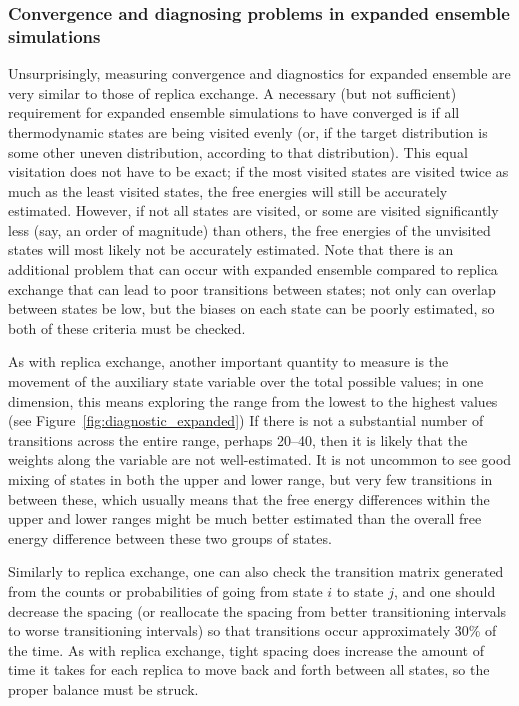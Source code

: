 \documentclass[9pt,review]{livecoms}
\begin{document}
\subsubsection{Convergence and diagnosing problems in expanded ensemble simulations}

Unsurprisingly, measuring convergence and diagnostics for expanded ensemble are very similar to those of replica exchange.  A necessary (but not sufficient) requirement for expanded ensemble simulations to have converged is if all thermodynamic states are being visited evenly (or, if the target distribution is some other uneven distribution, according to that distribution). This equal visitation does not have to be exact; if the most visited states are visited twice as much as the least visited states, the free energies will still be accurately estimated. However, if not all states are visited, or some are visited significantly less (say, an order of magnitude) than others, the free energies of the unvisited states will most likely not be accurately estimated.  Note that there is an additional problem that can occur with expanded ensemble compared to replica exchange that can lead to poor transitions between states; not only can overlap between states be low, but the biases on each state can be poorly estimated, so both of these criteria must be checked. 

As with replica exchange, another important quantity to measure is the movement of the auxiliary state variable over the total possible values; in one dimension, this means exploring the range from the lowest to the highest values (see Figure~\ref{fig:diagnostic_expanded}) If there is not a substantial number of transitions across the entire range, perhaps 20--40, then it is likely that the weights along the variable are not well-estimated. It is not uncommon to see good mixing of states in both the upper and lower range, but very few transitions in between these, which usually means that the free energy differences within the upper and lower ranges might be much better estimated than the overall free energy difference between these two groups of states.  

Similarly to replica exchange, one can also check the transition matrix generated from the counts or probabilities of going from state $i$ to state $j$, and one should decrease the spacing (or reallocate the spacing from better transitioning intervals to worse transitioning intervals) so that transitions occur approximately 30\% of the time.  As with replica exchange, tight spacing does increase the amount of time it takes for each replica to move back and forth between all states, so the proper balance must be struck. 
\end{document}
